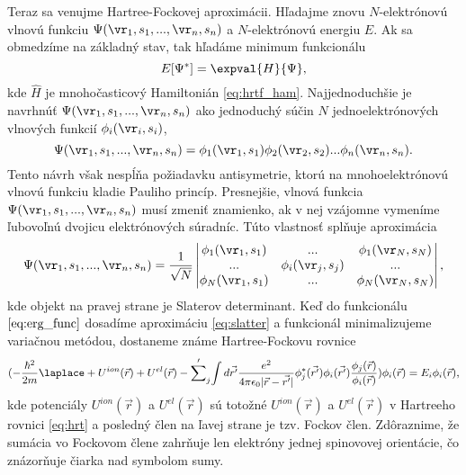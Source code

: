 Teraz sa venujme Hartree-Fockovej aproximácii. Hľadajme znovu $N$-elektrónovú vlnovú funkciu  $\Psi(\vr_1,s_1,...,\vr_n,s_n)$ a $N$-elektrónovú energiu $E$. Ak sa obmedzíme na základný stav,
tak hľadáme minimum funkcionálu
\begin{equation}
 \label{eq:erg_func}
 E[\Psi^*]=\expval{H}{\Psi}\text{,}
\end{equation}
kde $\hat{H}$ je mnohočasticový Hamiltonián \eqref{eq:hrtf_ham}. Najjednoduchšie je navrhnúť $\Psi(\vr_1,s_1,...,\vr_n,s_n)$ ako jednoduchý súčin
$N$ jednoelektrónových vlnových funkcií $\phi_i(\vr_i,s_i)$,
\begin{equation}
 \label{eq:Psi1}
 \Psi(\vr_1,s_1,...,\vr_n,s_n)=\phi_1(\vr_1,s_1)\phi_2(\vr_2,s_2)...\phi_n(\vr_n,s_n) \text{.}
\end{equation}
Tento návrh však nespĺňa požiadavku antisymetrie, ktorú na mnohoelektrónovú vlnovú funkciu kladie Pauliho princíp. Presnejšie, vlnová funkcia $\Psi(\vr_1,s_1,...,\vr_n,s_n)$ musí zmeniť znamienko,
ak v nej vzájomne vymeníme ľubovoľnú dvojicu elektrónových súradníc. Túto vlastnosť splňuje aproximácia
\begin{equation}
\label{eq:slatter}
 \Psi(\vr_1,s_1,...,\vr_n,s_n)=\frac{1}{\sqrt N}
\begin{vmatrix}

\phi_1(\vr_1,s_1)& ... & \phi_1(\vr_N,s_N) \\
  ...&  \phi_i(\vr_j,s_j)& ... \\
 \phi_N(\vr_1,s_1)& ... & \phi_N(\vr_N,s_N)
\end{vmatrix}
\text{,}
\end{equation}
kde objekt na pravej strane je Slaterov determinant. Keď do funkcionálu $\eqref{eq:erg_func}$ dosadíme aproximáciu \eqref{eq:slatter} a funkcionál minimalizujeme variačnou metódou,
dostaneme známe Hartree-Fockovu rovnice
\begin{equation}
 \label{eq:fock3}
 (-\frac{\hbar^2}{2m}\laplace +U^{ion}(\vec{r})+U^{el}(\vec{r})-
 {\sum'}_j{\int d\vec{r'}\frac{e^2}{4\pi \epsilon_0|\vec{r}-\vec{r'}|}
 \phi_j^{*}(\vec{r'})\phi_i(\vec{r'})\frac{\phi_j(\vec{r})}{\phi_i(\vec{r})}})\phi_i({\vec{r}})=E_i\phi_i(\vec{r}) \text{,}
\end{equation}
kde potenciály $U^{ion}(\vec{r})$ a $U^{el}(\vec{r})$ sú totožné $U^{ion}(\vec{r})$ a $U^{el}(\vec{r})$ v Hartreeho rovnici \eqref{eq:hrt} a posledný člen na ľavej strane je tzv. Fockov člen.
Zdôraznime, že sumácia vo Fockovom člene zahrňuje len elektróny jednej spinovovej orientácie, čo znázorňuje čiarka nad symbolom sumy.

